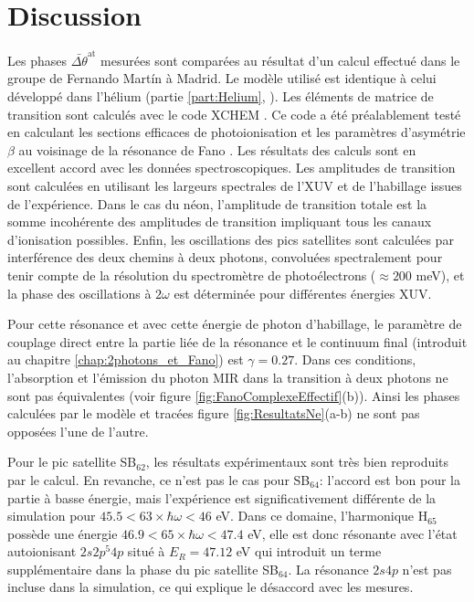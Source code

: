 \section{Discussion}
Les phases $\bar{\Delta \theta}^{\text{at}}$ mesurées sont comparées au résultat d'un calcul effectué dans le groupe de Fernando Mart\'{i}n à Madrid. Le modèle utilisé est identique à celui développé dans l'hélium (partie \ref{part:Helium}, ). Les éléments de matrice de transition sont calculés avec le code XCHEM . Ce code a été préalablement testé en calculant les sections efficaces de photoionisation et les paramètres d'asymétrie $\beta$ au voisinage de la résonance de Fano . Les résultats des calculs sont en excellent accord avec les données spectroscopiques. Les amplitudes de transition sont calculées en utilisant les largeurs spectrales de l'XUV et de l'habillage issues de l'expérience. Dans le cas du néon, l'amplitude de transition totale est la somme incohérente des amplitudes de transition impliquant tous les canaux d'ionisation possibles. Enfin, les oscillations des pics satellites sont calculées par interférence des deux chemins à deux photons, convoluées spectralement pour tenir compte de la résolution du spectromètre de photoélectrons ($\approx 200$ meV), et la phase des oscillations à $2 \omega$ est déterminée pour différentes énergies XUV.

Pour cette résonance et avec cette énergie de photon d'habillage, le paramètre de couplage direct entre la partie liée de la résonance et le continuum final (introduit au chapitre \ref{chap:2photons_et_Fano}) est $\gamma = 0.27$. Dans ces conditions, l'absorption et l'émission du photon MIR dans la transition à deux photons ne sont pas équivalentes (voir figure \ref{fig:FanoComplexeEffectif}(b)). Ainsi les phases calculées par le modèle et tracées figure \ref{fig:ResultatsNe}(a-b) ne sont pas opposées l'une de l'autre.

Pour le pic satellite SB$_{62}$, les résultats expérimentaux sont très bien reproduits par le calcul. En revanche, ce n'est pas le cas pour SB$_{64}$: l'accord est bon pour la partie à basse énergie, mais l'expérience est significativement différente de la simulation pour $45.5 < 63 \times \hbar \omega < 46$ eV. Dans ce domaine, l'harmonique H$_{65}$ possède une énergie $46.9 < 65 \times \hbar \omega < 47.4$ eV, elle est donc résonante avec l'état autoionisant $2s2p^{5}4p$ situé à $E_R = 47.12$ eV qui introduit un terme supplémentaire dans la phase du pic satellite SB$_{64}$. La résonance $2s4p$ n'est pas incluse dans la simulation, ce qui explique le désaccord avec les mesures.

